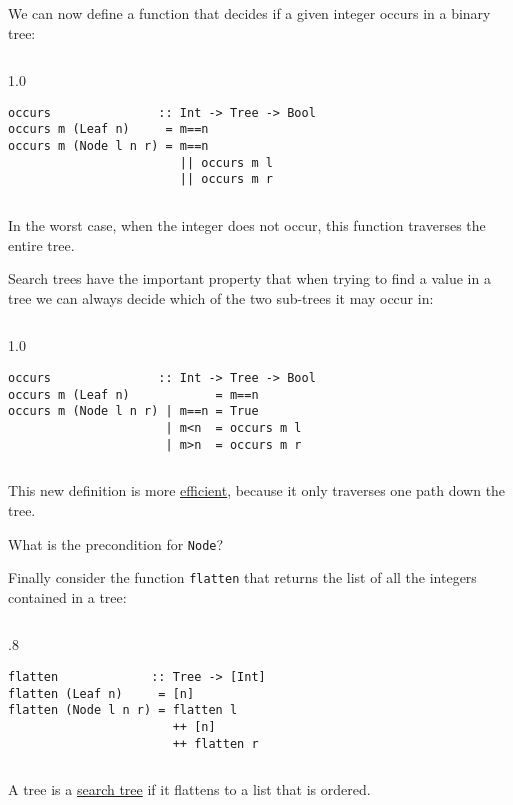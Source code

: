 \documentclass{beamer}
\newenvironment{execblock}[1][.8]{%
\begin{columns}
\begin{column}{#1\linewidth}
\begin{block}{}}{%
\end{block}
\end{column}
\end{columns}}
\def\frameskip{\vskip 0.1in}
\begin{document}
\begin{frame}[fragile]
\large

We can now define a function that decides if a given 
integer occurs in a binary tree: 

\frameskip

\begin{execblock}[1.0]
\begin{verbatim}
occurs               :: Int -> Tree -> Bool 
occurs m (Leaf n)     = m==n 
occurs m (Node l n r) = m==n 
                        || occurs m l 
                        || occurs m r 
\end{verbatim}
\end{execblock}

\frameskip

In the worst case, when the integer does not 
occur, this function traverses the entire tree.

\end{frame}

\begin{frame}[fragile]
\large

Search trees have the important property that when 
trying to find a value in a tree we can always decide 
which of the two sub-trees it may occur in: 

\frameskip

\begin{execblock}[1.0]
\begin{verbatim}
occurs               :: Int -> Tree -> Bool 
occurs m (Leaf n)            = m==n 
occurs m (Node l n r) | m==n = True 
                      | m<n  = occurs m l 
                      | m>n  = occurs m r
                      \end{verbatim}
\end{execblock}

\frameskip

This new definition is more \underline{efficient}, because it only 
traverses one path down the tree. 

What is the precondition for {\tt Node}?

\end{frame}
\begin{frame}[fragile]
\large

Finally consider the function {\tt flatten} that returns the 
list of all the integers contained in a tree: 

\frameskip

\begin{execblock}
\begin{verbatim}
flatten             :: Tree -> [Int] 
flatten (Leaf n)     = [n] 
flatten (Node l n r) = flatten l 
                       ++ [n] 
                       ++ flatten r 
\end{verbatim}
\end{execblock}

\frameskip
\frameskip

A tree is a \underline{search tree} if it flattens to a list that is ordered.
\end{frame}
\end{document}
